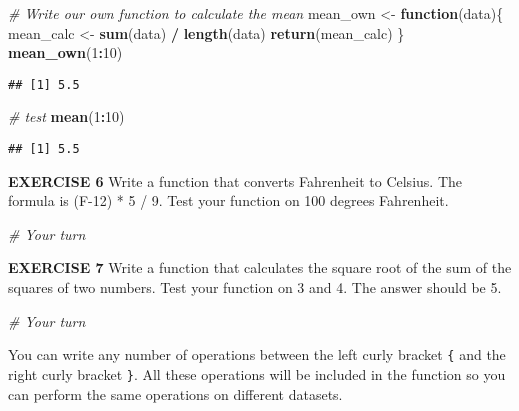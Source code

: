 \documentclass[
]{article}
\newenvironment{Shaded}{\begin{snugshade}}{\end{snugshade}}
\newcommand{\CommentTok}[1]{\textcolor[rgb]{0.56,0.35,0.01}{\textit{#1}}}
\newcommand{\ControlFlowTok}[1]{\textcolor[rgb]{0.13,0.29,0.53}{\textbf{#1}}}
\newcommand{\DecValTok}[1]{\textcolor[rgb]{0.00,0.00,0.81}{#1}}
\newcommand{\KeywordTok}[1]{\textcolor[rgb]{0.13,0.29,0.53}{\textbf{#1}}}
\newcommand{\NormalTok}[1]{#1}
\newcommand{\OperatorTok}[1]{\textcolor[rgb]{0.81,0.36,0.00}{\textbf{#1}}}
\newcommand{\StringTok}[1]{\textcolor[rgb]{0.31,0.60,0.02}{#1}}
\begin{document}
\begin{Shaded}
\begin{Highlighting}[]
\CommentTok{# Write our own function to calculate the mean}
\NormalTok{mean_own <-}\StringTok{ }\ControlFlowTok{function}\NormalTok{(data)\{}
\NormalTok{   mean_calc <-}\StringTok{ }\KeywordTok{sum}\NormalTok{(data) }\OperatorTok{/}\StringTok{ }\KeywordTok{length}\NormalTok{(data)}
   \KeywordTok{return}\NormalTok{(mean_calc)}
\NormalTok{\}}
\KeywordTok{mean_own}\NormalTok{(}\DecValTok{1}\OperatorTok{:}\DecValTok{10}\NormalTok{)}
\end{Highlighting}
\end{Shaded}

\begin{verbatim}
## [1] 5.5
\end{verbatim}

\begin{Shaded}
\begin{Highlighting}[]
\CommentTok{# test}
\KeywordTok{mean}\NormalTok{(}\DecValTok{1}\OperatorTok{:}\DecValTok{10}\NormalTok{)}
\end{Highlighting}
\end{Shaded}

\begin{verbatim}
## [1] 5.5
\end{verbatim}

\textbf{EXERCISE 6} Write a function that converts Fahrenheit to
Celsius. The formula is (F-12) * 5 / 9. Test your function on 100
degrees Fahrenheit.

\begin{Shaded}
\begin{Highlighting}[]
\CommentTok{# Your turn}
\end{Highlighting}
\end{Shaded}

\textbf{EXERCISE 7} Write a function that calculates the square root of
the sum of the squares of two numbers. Test your function on 3 and 4.
The answer should be 5.

\begin{Shaded}
\begin{Highlighting}[]
\CommentTok{# Your turn}
\end{Highlighting}
\end{Shaded}

You can write any number of operations between the left curly bracket
\texttt{\{} and the right curly bracket \texttt{\}}. All these
operations will be included in the function so you can perform the same
operations on different datasets.
\end{document}
